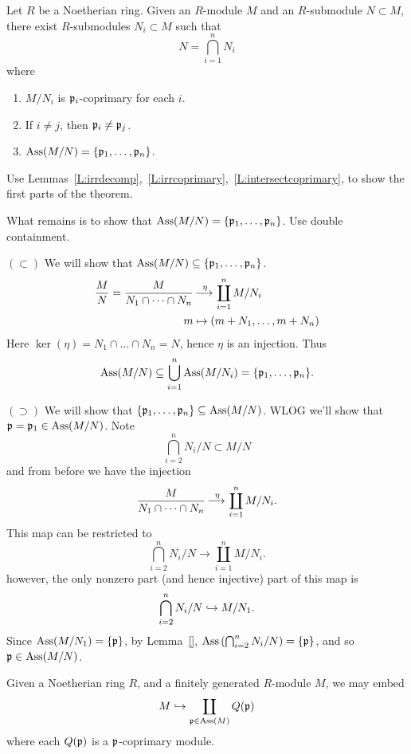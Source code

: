 \documentclass{ximera}
\begin{document}
\begin{theorem}
  Let $R$ be a Noetherian ring. Given an $R$-module $M$ and an
  $R$-submodule $N\subset M$, there exist $R$-submodules $N_i\subset
  M$ such that
  \[
  N = \bigcap_{i=1}^n N_i
  \]
  where
  \begin{enumerate}
  \item $M/N_i$ is $\mathfrak{p}_i$-coprimary for each $i$.
  \item If $i\ne j$, then $\mathfrak{p}_i\ne\mathfrak{p}_j$.
  \item $\operatorname{Ass}(M/N) = \{\mathfrak{p}_1,\dots,\mathfrak{p}_n\}$.
  \end{enumerate}
  \begin{sketch}
    Use Lemmas~\ref{L:irrdecomp},~\ref{L:irrcoprimary},~\ref{L:intersectcoprimary},
    to show the first parts of the theorem.
    
    What remains is to show that $\operatorname{Ass}(M/N) =
    \{\mathfrak{p}_1,\dots,\mathfrak{p}_n\}$. Use double containment.
    
    $(\subset)$ We will show that $\operatorname{Ass}(M/N)
    \subseteq\{\mathfrak{p}_1,\dots,\mathfrak{p}_n\}$.
    \begin{align*}
      \frac{M}{N} = \frac{M}{N_1\cap\dots\cap N_n} &\mathop{\longrightarrow\,}\limits^\eta \coprod_{i=1}^n M/N_i\\
        m &\mapsto (m + N_1,\dots, m+ N_n)
    \end{align*}
    Here $\ker(\eta) = N_1\cap\dots\cap N_n = N$, hence $\eta$ is an
    injection. Thus
    \[
    \operatorname{Ass}(M/N) \subseteq \bigcup_{i=1}^n \operatorname{Ass}(M/N_i) = \{\mathfrak{p}_1,\dots,\mathfrak{p}_n\}.
    \]


    $(\supset)$ We will show that $\{\mathfrak{p}_1,\dots,\mathfrak{p}_n\} \subseteq
    \operatorname{Ass}(M/N)$. WLOG we'll show that $\mathfrak{p}=\mathfrak{p}_1\in\operatorname{Ass}(M/N)$. Note
    \[
    \bigcap_{i=2}^n N_i/N \subset M/N
    \]
    and from before we have the injection
    \[
    \frac{M}{N_1\cap\dots\cap N_n} \mathop{\longrightarrow\,}\limits^\eta \coprod_{i=1}^n M/N_i.
    \]
    This map can be restricted to
    \[
    \bigcap_{i=2}^n N_i/N \to \coprod_{i=1}^n M/N_i.
    \]
    however, the only nonzero part (and hence injective) part of this
    map is
    \[
    \bigcap_{i=2}^n N_i/N \hookrightarrow M/N_1.
    \]
    Since $\operatorname{Ass}(M/N_1) = \{\mathfrak{p}\}$, by Lemma~\ref{},
    $\operatorname{Ass}\left(\bigcap_{i=2}^n N_i/N\right) = \{\mathfrak{p}\}$, and so
    $\mathfrak{p}\in\operatorname{Ass}(M/N)$.
  \end{sketch}
\end{theorem}





\begin{theorem}
  Given a Noetherian ring $R$, and a finitely generated $R$-module $M$, we may embed
  \[
  M\hookrightarrow \coprod_{\mathfrak{p}\in\operatorname{Ass}(M)} Q(\mathfrak{p})
  \]
  where each $Q(\mathfrak{p})$ is a $\mathfrak{p}$-coprimary module.
\end{theorem}
\end{document}
